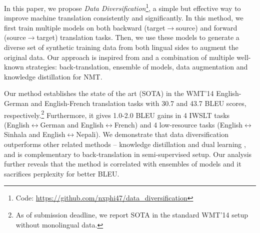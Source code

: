 \documentclass{article}
\begin{document}
In this paper, we propose \emph{Data Diversification}\footnote{Code: \href{https://github.com/nxphi47/data_diversification}{https://github.com/nxphi47/data\_diversification}}, a simple but effective way to improve machine translation consistently and significantly. In this method, we first train multiple models on both backward (target$\rightarrow$source) and forward (source$\rightarrow$target) translation tasks. Then, we use these models to generate a diverse set of synthetic training data from both lingual sides to augment the original data. Our approach is inspired from and a combination of multiple well-known strategies: back-translation, ensemble of models, data augmentation and knowledge distillation for NMT. 

Our method establishes the state of the art (SOTA) in the WMT'14 English-German and English-French translation tasks with 30.7 and 43.7 BLEU scores, respectively.\footnote{As of submission deadline, we report SOTA in the standard WMT'14 setup without monolingual data.} Furthermore, it gives 1.0-2.0 BLEU gains in 4 IWSLT tasks (English$\leftrightarrow$German and English$\leftrightarrow$French) and 4 low-resource tasks (English$\leftrightarrow$Sinhala and English$\leftrightarrow$Nepali). {We demonstrate that data diversification outperforms other related methods -- knowledge distillation \citep{knowledge_distill_kim_rush_2016} and dual learning \cite{multiagent}}, and is complementary to back-translation \citep{backtranslate_sennrich-etal-2016-improving} in semi-supervised setup. Our analysis further reveals that the method is correlated with ensembles of models and it sacrifices perplexity for better BLEU.





\begin{comment}
Data Augmentation for Low-Resource Neural Machine Translation
https://www.aclweb.org/anthology/P17-2090/

SwitchOut: an Efficient Data Augmentation Algorithm for Neural Machine Translation
https://www.aclweb.org/anthology/D18-1100/

Soft Contextual Data Augmentation for Neural Machine Translation
https://arxiv.org/pdf/1905.10523.pdf

Improving Neural Machine Translation Robustness via Data Augmentation: Beyond Back Translation
https://arxiv.org/pdf/1910.03009.pdf

UNSUPERVISED DATA AUGMENTATION FOR CONSISTENCY TRAINING
https://arxiv.org/pdf/1904.12848.pdf

QANet augmentation


Improving Neural Machine Translation Models with Monolingual Data
https://arxiv.org/pdf/1511.06709.pdf

On The Evaluation of Machine Translation Systems Trained With Back-Translation
https://arxiv.org/pdf/1908.05204.pdf

https://blog.statsbot.co/ensemble-learning-d1dcd548e936
\end{comment}
\end{document}
